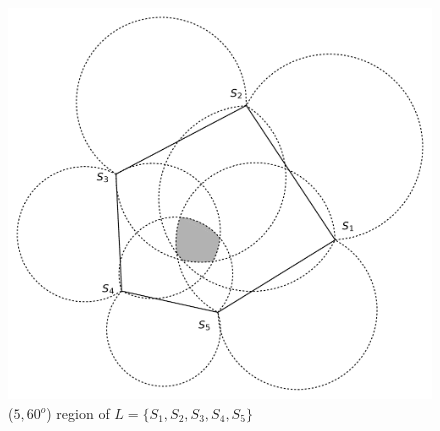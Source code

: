\begin{figure}[h]
\centering
\includegraphics[scale=0.6]{Hinhanh/multipleview-region}
\caption{($5,60^o$) region of $L=\{S_1,S_2,S_3,S_4,S_5\}$}
\label{multipleview}
\end{figure}
